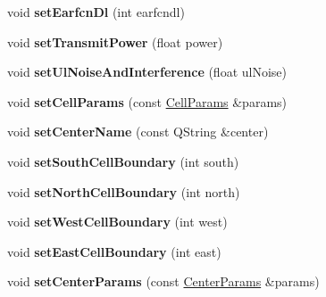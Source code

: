 \begin{DoxyCompactItemize}
\item 
void {\bfseries set\+Earfcn\+Dl} (int earfcndl)\hypertarget{class_cell_data_af25ca29aa59f935b8bac39a84dab05a9}{}\label{class_cell_data_af25ca29aa59f935b8bac39a84dab05a9}

\item 
void {\bfseries set\+Transmit\+Power} (float power)\hypertarget{class_cell_data_aa56b0d9abcd8a6578712d0fc758e014b}{}\label{class_cell_data_aa56b0d9abcd8a6578712d0fc758e014b}

\item 
void {\bfseries set\+Ul\+Noise\+And\+Interference} (float ul\+Noise)\hypertarget{class_cell_data_a34d1260736130ed14c598c59608f2785}{}\label{class_cell_data_a34d1260736130ed14c598c59608f2785}

\item 
void {\bfseries set\+Cell\+Params} (const \hyperlink{struct_cell_params}{Cell\+Params} \&params)\hypertarget{class_cell_data_a20935748660ee7cbf7a4cd8740b01c32}{}\label{class_cell_data_a20935748660ee7cbf7a4cd8740b01c32}

\item 
void {\bfseries set\+Center\+Name} (const Q\+String \&center)\hypertarget{class_cell_data_a63b52fe7adb67c5129854384a0a917e8}{}\label{class_cell_data_a63b52fe7adb67c5129854384a0a917e8}

\item 
void {\bfseries set\+South\+Cell\+Boundary} (int south)\hypertarget{class_cell_data_a0976ebf505d907d79f6ae671773320a3}{}\label{class_cell_data_a0976ebf505d907d79f6ae671773320a3}

\item 
void {\bfseries set\+North\+Cell\+Boundary} (int north)\hypertarget{class_cell_data_a1062fc88142921a3d4f6fbb5971f6003}{}\label{class_cell_data_a1062fc88142921a3d4f6fbb5971f6003}

\item 
void {\bfseries set\+West\+Cell\+Boundary} (int west)\hypertarget{class_cell_data_a3d6856eaf2f36a0d3a8bd4cb833ba9c7}{}\label{class_cell_data_a3d6856eaf2f36a0d3a8bd4cb833ba9c7}

\item 
void {\bfseries set\+East\+Cell\+Boundary} (int east)\hypertarget{class_cell_data_a48accedd54bb594f2e1395a9fb33c437}{}\label{class_cell_data_a48accedd54bb594f2e1395a9fb33c437}

\item 
void {\bfseries set\+Center\+Params} (const \hyperlink{struct_center_params}{Center\+Params} \&params)\hypertarget{class_cell_data_a2378088d9091e149d53bee386d6bbd21}{}\label{class_cell_data_a2378088d9091e149d53bee386d6bbd21}


\end{DoxyCompactItemize}
